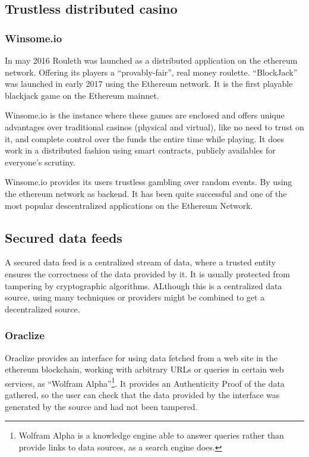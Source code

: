 \subsection{Trustless distributed casino}

\subsubsection{Winsome.io}
In may 2016 Rouleth \cite{winsomeio} was launched as a distributed application
  on the ethereum network. Offering its players a ``provably-fair'', real money
  roulette.
``BlockJack'' was launched in early 2017 using the Ethereum network.
It is the first playable blackjack game on the Ethereum mainnet.

Winsome.io is the instance where these games are enclosed and offers unique
  advantages over traditional casinos (physical and virtual), like no need to
  trust on it, and complete control over the funds the entire time while
  playing.
It does work in a distributed fashion using smart contracts, publicly availables
  for everyone's scrutiny.

Winsome.io provides its users trustless gambling over random events.
By using the ethereum network as backend.
It has been quite successful and one of the most popular descentralized
  applications on the Ethereum Network.

\subsection{Secured data feeds}
A secured data feed is a centralized stream of data, where a trusted entity
  ensures the correctness of the data provided by it.
It is usually protected from tampering by cryptographic algorithms.
ALthough this is a centralized data source, using many techniques or providers
  might be combined to get a decentralized source.

\subsubsection{Oraclize}
Oraclize \cite{oraclizeit} provides an interface for using data fetched from a
  web site in the ethereum blockchain, working with arbitrary URLs or queries
  in certain web services, as ``Wolfram Alpha''\footnote{Wolfram Alpha is a
  knowledge engine able to answer queries rather than provide links to data
  sources, as a search engine does.}.
It provides an Authenticity Proof of the data gathered, so the user can check
  that the data provided by the interface was generated by the source and had
  not been tampered.

